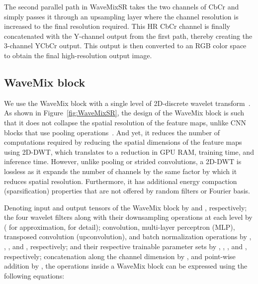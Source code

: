\documentclass{article}
\begin{document}
The second parallel path in WaveMixSR takes the two channels of CbCr and simply passes it through an upsampling layer where the channel resolution is increased to the final resolution required. This HR CbCr channel is finally concatenated with the Y-channel output  from the first path, thereby creating the 3-channel YCbCr output. This output is then converted to an RGB color space to obtain the final high-resolution output image.


\subsection{WaveMix block}

We use the WaveMix block with a single level of 2D-discrete wavelet transform~\cite{jeevan2023wavemix}. As shown in Figure~\ref{fig:WaveMixSR}, the design of the WaveMix block is such that it does not collapse the spatial resolution of the feature maps, unlike CNN blocks that use pooling operations~\cite{https://doi.org/10.48550/arxiv.1512.03385}. And yet, it reduces the number of computations required by reducing the spatial dimensions of the feature maps using 2D-DWT, which translates to a reduction in GPU RAM, training time, and inference time. However, unlike pooling or strided convolutions, a 2D-DWT is lossless as it expands the number of channels by the same factor by which it reduces spatial resolution. Furthermore, it has additional energy compaction (sparsification) properties that are not offered by random filters or Fourier basis.


Denoting input and output tensors of the WaveMix block by  and , respectively; the four wavelet filters along with their downsampling operations at each level by  ( for approximation,  for detail); convolution, multi-layer perceptron (MLP), transposed convolution (upconvolution), and batch normalization operations by , , , and , respectively; and their respective trainable parameter sets by , , , and , respectively; concatenation along the channel dimension by , and point-wise addition by , the operations inside a WaveMix block can be expressed using the following equations:










 
\end{document}
